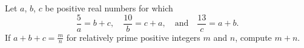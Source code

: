 Let $a$, $b$, $c$ be positive real numbers for which \[
	\frac{5}{a} = b+c, \quad
	\frac{10}{b} = c+a, \quad \text{and} \quad
	\frac{13}{c} = a+b. \] If $a+b+c = \frac mn$ for relatively prime positive integers $m$ and $n$, compute $m+n$.
